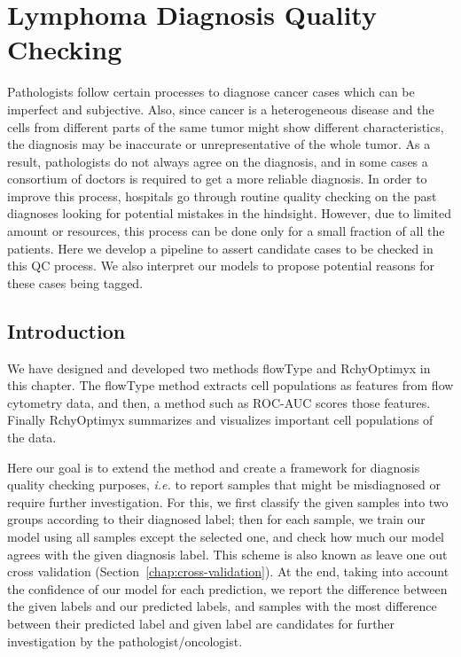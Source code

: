 \section{Lymphoma Diagnosis Quality Checking}
Pathologists follow certain processes to diagnose cancer cases which can be imperfect and subjective. Also, since cancer is a heterogeneous disease and the cells from different parts of the same tumor might show different characteristics, the diagnosis may be inaccurate or unrepresentative of the whole tumor. As a result, pathologists do not always agree on the diagnosis, and in some cases a consortium of doctors is required to get a more reliable diagnosis. In order to improve this process, hospitals go through routine quality checking on the past diagnoses looking for potential mistakes in the hindsight. However, due to limited amount or resources, this process can be done only for a small fraction of all the patients. Here we develop a pipeline to assert candidate cases to be checked in this QC process. We also interpret our models to propose potential reasons for these cases being tagged.

\subsection{Introduction}
We have designed and developed two methods flowType and RchyOptimyx in this chapter.
The flowType method extracts cell populations as features from flow cytometry data, and then, a method such as ROC-AUC scores those features. Finally RchyOptimyx summarizes and visualizes important cell populations of the data.

Here our goal is to extend the method and create a framework for diagnosis quality checking purposes, \emph{i.e.} to report samples that might be misdiagnosed or require further investigation. For this, we first classify the given samples into two groups according to their diagnosed label; then for each sample, we train our model using all samples except the selected one, and check how much our model agrees with the given diagnosis label. This scheme is also known as leave one out cross validation (Section~\ref{chap:cross-validation}). At the end, taking into account the confidence of our model for each prediction, we report the difference between the given labels and our predicted labels, and samples with the most difference between their predicted label and given label are candidates for further investigation by the pathologist/oncologist.
